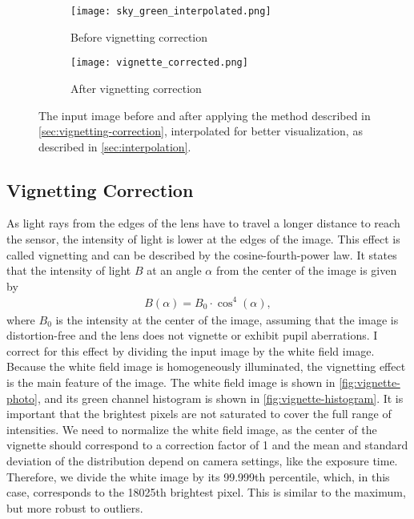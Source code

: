 \begin{figure}[tbp]
  \centering
  \begin{subfigure}{.49\textwidth}
    \centering
    \texttt{[image: sky\_green\_interpolated.png]}
    \caption{Before vignetting correction}
  \end{subfigure}%
  \hfill
  \begin{subfigure}{.49\textwidth}
    \centering
    \texttt{[image: vignette\_corrected.png]}
    \caption{After vignetting correction}
  \end{subfigure}
  \caption{The input image before and after applying the method described in
    \autoref{sec:vignetting-correction}, interpolated for better visualization, as
    described in \autoref{sec:interpolation}.}
  \label{fig:vignette-correction}
\end{figure}

\subsection{Vignetting Correction}
\label{sec:vignetting-correction}

As light rays from the edges of the lens have to travel a longer distance to reach the
sensor, the intensity of light is lower at the edges of the image. This effect is called
vignetting and can be described by the cosine-fourth-power law. It states that the
intensity of light $B$ at an angle $\alpha$ from the center of the image is given by
\begin{align*}
  B(\alpha) = B_{0} \cdot \cos^{4}(\alpha),
\end{align*}
where $B_{0}$ is the intensity at the center of the image, assuming that the image is
distortion-free and the lens does not vignette or exhibit pupil aberrations. I correct for
this effect by dividing the input image by the white field image. Because the white field
image is homogeneously illuminated, the vignetting effect is the main feature of the
image. The white field image is shown in \autoref{fig:vignette-photo}, and its green
channel histogram is shown in \autoref{fig:vignette-histogram}. It is important that the
brightest pixels are not saturated to cover the full range of intensities. We need to
normalize the white field image, as the center of the vignette should correspond to a
correction factor of 1 and the mean and standard deviation of the distribution depend on
camera settings, like the exposure time. Therefore, we divide the white image by its
99.999th percentile, which, in this case, corresponds to the 18025th brightest pixel. This
is similar to the maximum, but more robust to outliers.

